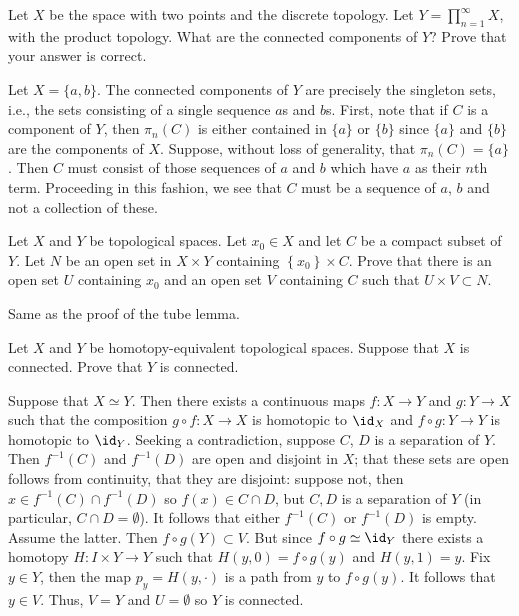 \begin{problem}
  Let \(X\) be the space with two points and the discrete topology. Let
  \(Y=\prod_{n=1}^\infty X\), with the product topology. What are the
  connected components of \(Y\)? Prove that your answer is correct.
\end{problem}
\begin{solution}
  Let \(X=\{a,b\}\). The connected components of \(Y\) are precisely the
  singleton sets, i.e., the sets consisting of a single sequence \(a\)s and
  \(b\)s. First, note that if \(C\) is a component of \(Y\), then
  \(\pi_n(C)\) is either contained in \(\{a\}\) or \(\{b\}\) since
  \(\{a\}\) and \(\{b\}\) are the components of \(X\). Suppose, without
  loss of generality, that \(\pi_n(C)=\{a\}\). Then \(C\) must consist of
  those sequences of \(a\) and \(b\) which have \(a\) as their \(n\)th
  term. Proceeding in this fashion, we see that \(C\) must be a sequence of
  \(a\), \(b\) and not a collection of these.
\end{solution}

\begin{problem}
  Let \(X\) and \(Y\) be topological spaces. Let \(x_0\in X\) and let \(C\)
  be a compact subset of \(Y\). Let \(N\) be an open set in \(X\times Y\)
  containing \(\left\{x_0\right\}\times C\). Prove that there is an open
  set \(U\) containing \(x_0\) and an open set \(V\) containing \(C\) such
  that \(U\times V\subset N\).
\end{problem}
\begin{solution}
  Same as the proof of the tube lemma.
\end{solution}

\begin{problem}
  Let \(X\) and \(Y\) be homotopy-equivalent topological spaces. Suppose
  that \(X\) is connected. Prove that \(Y\) is connected.
\end{problem}
\begin{solution}
  Suppose that \(X\simeq Y\). Then there exists a continuous maps
  \(f\colon X\to Y\) and \(g\colon Y\to X\) such that the composition
  \(g\circ f\colon X\to X\) is homotopic to \(\id_X\) and
  \(f\circ g\colon Y\to Y\) is homotopic to \(\id_Y\). Seeking a
  contradiction, suppose \(C\), \(D\) is a separation of \(Y\). Then
  \(f^{-1}(C)\) and \(f^{-1}(D)\) are open and disjoint in \(X\); that
  these sets are open follows from continuity, that they are disjoint:
  suppose not, then \(x\in f^{-1}(C)\cap f^{-1}(D)\) so \(f(x)\in C\cap
  D\), but \(C,D\) is a separation of \(Y\) (in particular, \(C\cap
  D=\emptyset\)). It follows that either \(f^{-1}(C)\) or \(f^{-1}(D)\) is
  empty. Assume the latter. Then \(f\circ g(Y)\subset V\). But since
  \(f\circ g\simeq \id_Y\) there exists a homotopy \(H\colon I\times Y\to
  Y\) such that \(H(y,0)=f\circ g(y)\) and \(H(y,1)=y\). Fix \(y\in Y\),
  then the map \(p_y=H(y,\cdot)\) is a path from \(y\) to \(f\circ
  g(y)\). It follows that \(y\in V\). Thus, \(V=Y\) and \(U=\emptyset\) so
  \(Y\) is connected.
\end{solution}

